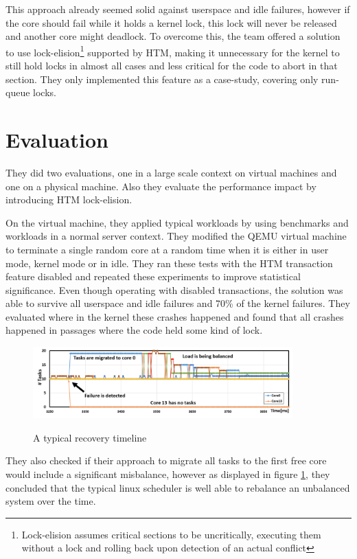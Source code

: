 \documentclass[a4paper,10pt,twoside]{article}
\begin{document}
This approach already seemed solid against userspace and idle failures, however if the core should fail while it holds a kernel lock, this lock will never be released and another core might deadlock. To overcome this, the team offered a solution to use lock-elision\footnote{Lock-elision assumes critical sections to be uncritically, executing them without a lock and rolling back upon detection of an actual conflict} supported by HTM, making it unnecessary for the kernel to still hold locks in almost all cases and less critical for the code to abort in that section. They only implemented this feature as a case-study, covering only run-queue locks.

\section{Evaluation}

They did two evaluations, one in a large scale context on virtual machines and one on a physical machine. Also they evaluate the performance impact by introducing HTM lock-elision. 

On the virtual machine, they applied typical workloads by using benchmarks and workloads in a normal server context. They modified the QEMU virtual machine to terminate a single random core at a random time when it is either in user mode, kernel mode or in idle. They ran these tests with the HTM transaction feature disabled and repeated these experiments to improve statistical significance. Even though operating with disabled transactions, the solution was able to survive all userspace and idle failures and 70\% of the kernel failures. They evaluated where in the kernel these crashes happened and found that all crashes happened in passages where the code held some kind of lock.

\begin{figure}[t]
	\caption{A typical recovery timeline}
	\includegraphics[width=10cm]{timeline}
	\centering
	\label{fig:timeline}
\end{figure}


They also checked if their approach to migrate all tasks to the first free core would include a significant misbalance, however as displayed in figure \ref{fig:timeline}, they concluded that the typical linux scheduler is well able to rebalance an unbalanced system over the time.
\end{document}
